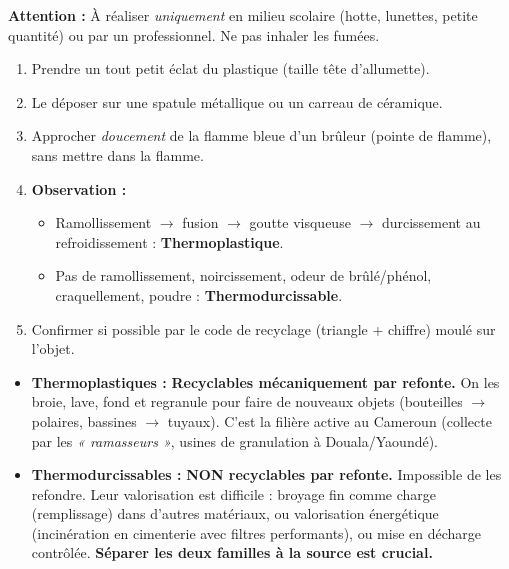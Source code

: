 \documentclass[11pt]{article}
\begin{document}
\begin{methode}
\textbf{Attention :} À réaliser \emph{uniquement} en milieu scolaire (hotte, lunettes, petite quantité) ou par un professionnel. Ne pas inhaler les fumées.
\begin{enumerate}
    \item Prendre un tout petit éclat du plastique (taille tête d'allumette).
    \item Le déposer sur une spatule métallique ou un carreau de céramique.
    \item Approcher \emph{doucement} de la flamme bleue d'un brûleur (pointe de flamme), sans mettre dans la flamme.
    \item \textbf{Observation :}
    \begin{itemize}
        \item Ramollissement $\rightarrow$ fusion $\rightarrow$ goutte visqueuse $\rightarrow$ durcissement au refroidissement : \textbf{Thermoplastique}.
        \item Pas de ramollissement, noircissement, odeur de brûlé/phénol, craquellement, poudre : \textbf{Thermodurcissable}.
    \end{itemize}
    \item Confirmer si possible par le code de recyclage (triangle + chiffre) moulé sur l'objet.
\end{enumerate}
\end{methode}

\begin{aretenir}
\begin{itemize}
    \item \textbf{Thermoplastiques :} \textbf{Recyclables mécaniquement par refonte.} On les broie, lave, fond et regranule pour faire de nouveaux objets (bouteilles $\rightarrow$ polaires, bassines $\rightarrow$ tuyaux). C'est la filière active au Cameroun (collecte par les \emph{« ramasseurs »}, usines de granulation à Douala/Yaoundé).
    \item \textbf{Thermodurcissables :} \textbf{NON recyclables par refonte.} Impossible de les refondre. Leur valorisation est difficile : broyage fin comme charge (remplissage) dans d'autres matériaux, ou valorisation énergétique (incinération en cimenterie avec filtres performants), ou mise en décharge contrôlée. \textbf{Séparer les deux familles à la source est crucial.}
\end{itemize}
\end{aretenir}
\end{document}
